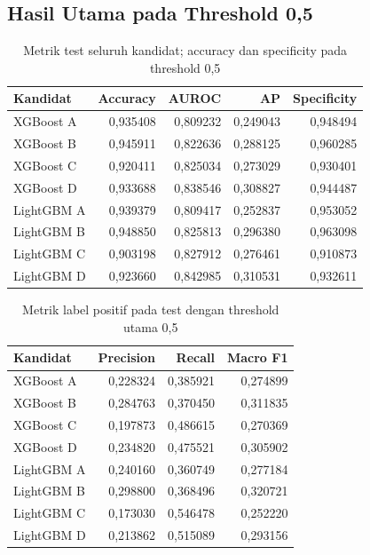 \subsection{Hasil Utama pada Threshold 0,5}
\begin{table}[htbp]
\centering
\caption{Metrik test seluruh kandidat; accuracy dan specificity pada threshold 0,5}
\label{tab:test_pemeringkatan_kandidat}
\small
\setlength{\tabcolsep}{4pt}
\begin{tabular}{lrrrr}
\toprule
Kandidat & Accuracy & AUROC & AP & Specificity \\
\midrule
XGBoost A & 0,935408 & 0,809232 & 0,249043 & 0,948494 \\
XGBoost B & 0,945911 & 0,822636 & 0,288125 & 0,960285 \\
XGBoost C & 0,920411 & 0,825034 & 0,273029 & 0,930401 \\
XGBoost D & 0,933688 & 0,838546 & 0,308827 & 0,944487 \\
LightGBM A & 0,939379 & 0,809417 & 0,252837 & 0,953052 \\
LightGBM B & 0,948850 & 0,825813 & 0,296380 & 0,963098 \\
LightGBM C & 0,903198 & 0,827912 & 0,276461 & 0,910873 \\
LightGBM D & 0,923660 & 0,842985 & 0,310531 & 0,932611 \\
\bottomrule
\end{tabular}
\end{table}
\begin{table}[htbp]
\centering
\caption{Metrik label positif pada test dengan threshold utama 0,5}
\label{tab:test_label_positif_kandidat}
\small
\setlength{\tabcolsep}{4pt}
\begin{tabular}{lrrr}
\toprule
Kandidat & Precision & Recall & Macro F1 \\
\midrule
XGBoost A & 0,228324 & 0,385921 & 0,274899 \\
XGBoost B & 0,284763 & 0,370450 & 0,311835 \\
XGBoost C & 0,197873 & 0,486615 & 0,270369 \\
XGBoost D & 0,234820 & 0,475521 & 0,305902 \\
LightGBM A & 0,240160 & 0,360749 & 0,277184 \\
LightGBM B & 0,298800 & 0,368496 & 0,320721 \\
LightGBM C & 0,173030 & 0,546478 & 0,252220 \\
LightGBM D & 0,213862 & 0,515089 & 0,293156 \\
\bottomrule
\end{tabular}
\end{table}

